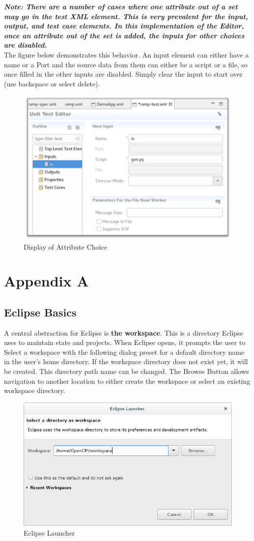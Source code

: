 \documentclass[10pt, a4paper, oneside]{article}
\begin{document}
\textbf{\emph{Note: There are a number of cases where one attribute out of a set may go in the test XML element. This is very prevalent for the input, output, and test case elements. In this implementation of the Editor, once an attribute out of the set is added, the inputs for other choices are disabled.}}\\

The figure below demonstrates this behavior. An input element can either have a name or a Port and the source data from them can either be a script or a file, so once filled in the other inputs are disabled. Simply clear the input to start over (use backspace or select delete).\\
\begin{figure}[h!]
	\centering
	\caption{Display of Attribute Choice}{}
	\includegraphics[width=.65\textwidth]{DisplayofAttributeChoice.png}
 \end{figure}


\newpage
\section{Appendix A}
\subsection{Eclipse Basics}
A central abstraction for Eclipse is \textbf{the workspace}. This is a directory Eclipse uses to maintain state and projects. When Eclipse opens, it prompts the user to Select a workspace with the following dialog preset for a default directory name in the user’s home directory. If the workspace directory does not exist yet, it will be created. This directory path name can be changed. The Browse Button allows navigation to another location to either create the workspace or select an existing workspace directory.
 \begin{figure}[h!]
	\centering
	\caption{Eclipse Launcher}{}
	\includegraphics[width=.70\textwidth]{EclipseLauncher.png}
 \end{figure}
\end{document}
